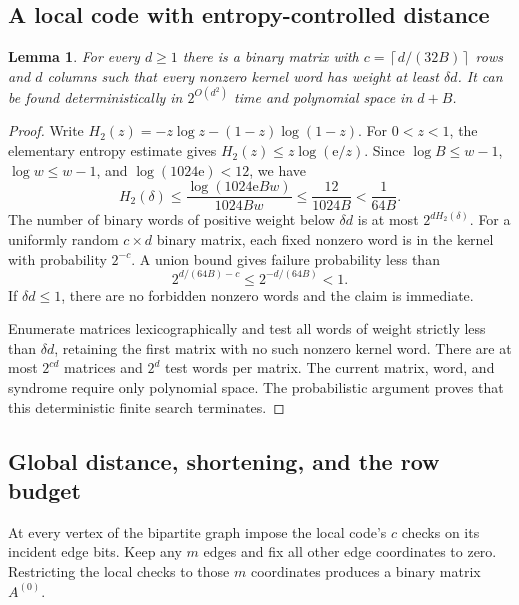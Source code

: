 \documentclass[11pt]{article}
\newtheorem{lemma}[theorem]{Lemma}
\theoremstyle{remark}
\newcommand{\ceil}[1]{\left\lceil #1\right\rceil}
\begin{document}
\subsection{A local code with entropy-controlled distance}
\begin{lemma}\label{lem:local-code}
For every \(d\ge1\) there is a binary matrix with
\(c=\ceil{d/(32B)}\) rows and \(d\) columns such that every nonzero
kernel word has weight at least \(\delta d\).
It can be found deterministically in \(2^{O(d^2)}\) time and
polynomial space in \(d+B\).
\end{lemma}
\begin{proof}
Write \(H_2(z)=-z\log z-(1-z)\log(1-z)\).
For \(0<z<1\), the elementary entropy estimate gives
\(H_2(z)\le z\log(\mathrm e/z)\).
Since \(\log B\le w-1\), \(\log w\le w-1\), and
\(\log(1024\mathrm e)<12\), we have
\[
 H_2(\delta)
 \le\frac{\log(1024\mathrm e Bw)}{1024Bw}
 \le\frac{12}{1024B}<\frac1{64B}.
\]
The number of binary words of positive weight below \(\delta d\)
is at most \(2^{dH_2(\delta)}\). For a uniformly random
\(c\times d\) binary matrix, each fixed nonzero word is in the
kernel with probability \(2^{-c}\). A union bound gives failure
probability less than
\[
 2^{d/(64B)-c}\le2^{-d/(64B)}<1.
\]
If \(\delta d\le1\), there are no forbidden nonzero words and the
claim is immediate.

Enumerate matrices lexicographically and test all words of weight
strictly less than \(\delta d\), retaining the first matrix with no
such nonzero kernel word. There are at most \(2^{cd}\) matrices and
\(2^d\) test words per matrix. The current matrix, word, and syndrome
require only polynomial space. The probabilistic argument proves
that this deterministic finite search terminates.
\end{proof}

\subsection{Global distance, shortening, and the row budget}
At every vertex of the bipartite graph impose the local code's \(c\)
checks on its incident edge bits. Keep any \(m\) edges and fix all other
edge coordinates to zero. Restricting the local checks to those \(m\)
coordinates produces a binary matrix \(A^{(0)}\).
\end{document}
